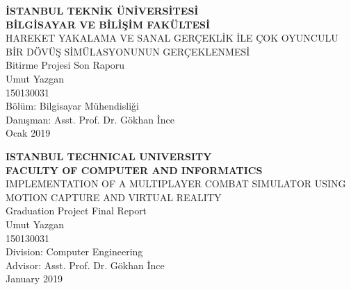 \documentclass[a4paper, 12pt, titlepage]{article}
\title{\thetitle}
\author{\theauthor}
\date{\thedate}
\newcommand{\thetitle}{IMPLEMENTATION OF A MULTIPLAYER COMBAT SIMULATOR USING MOTION CAPTURE AND
                       VIRTUAL REALITY}
\newcommand{\theturkishtitle}{HAREKET YAKALAMA VE SANAL GERÇEKLİK İLE ÇOK OYUNCULU BİR DÖVÜŞ
                              SİMÜLASYONUNUN GERÇEKLENMESİ}
\newcommand{\theauthor}{Umut Yazgan}
\newcommand{\thedate}{January 2019}
\newcommand{\theturkishdate}{Ocak 2019}
\begin{document}
\shorthandoff{=}


\begin{titlepage}
    \bfseries %
    \sffamily %
    \begin{center}
        \LARGE{\textbf{İSTANBUL TEKNİK ÜNİVERSİTESİ \\ 
               BİLGİSAYAR VE BİLİŞİM FAKÜLTESİ} } \\
        \vspace{5.5cm}
        \LARGE{\theturkishtitle}  \\
        \vspace{3.5cm}
        \Large{Bitirme Projesi Son Raporu} \\
        \vspace{0.5cm}
        \Large{\theauthor} \\
        \Large{150130031} \\
        \vspace{3.75cm}
        \large{Bölüm: Bilgisayar Mühendisliği } \\
        \vspace{1cm}
        \large{Danışman: Asst. Prof. Dr. Gökhan İnce} \\
        \vspace{\fill} %
        \large{\normalfont \sffamily \theturkishdate}
    \end{center}
\end{titlepage}

\begin{titlepage}
    \bfseries %
    \sffamily %
    \begin{center}
        \LARGE{\textbf{ISTANBUL TECHNICAL UNIVERSITY \\ 
               FACULTY OF COMPUTER AND INFORMATICS} } \\
        \vspace{5.5cm}
        \LARGE{\thetitle}  \\
        \vspace{3.5cm}
        \Large{Graduation Project Final Report} \\
        \vspace{0.5cm}
        \Large{\theauthor} \\
        \Large{150130031} \\
        \vspace{3.75cm}
        \large{Division: Computer Engineering} \\
        \vspace{1cm}
        \large{Advisor: Asst. Prof. Dr. Gökhan İnce} \\
        \vspace{\fill} %
        \large{\normalfont \sffamily \thedate}
    \end{center}
\end{titlepage}
\end{document}
